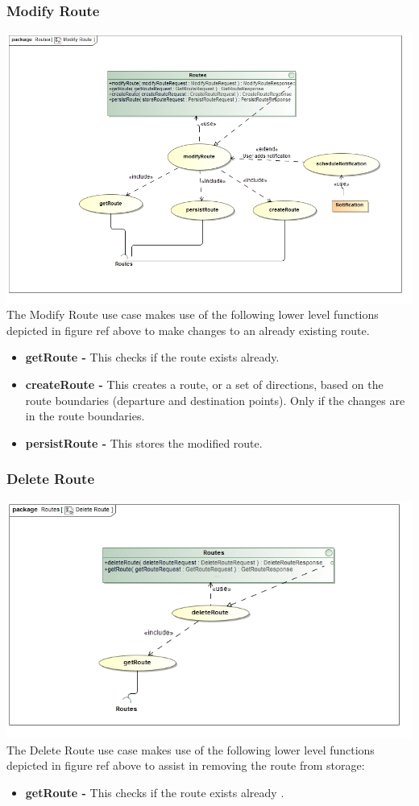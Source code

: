 \documentclass[a4paper,12pt]{article}
\begin{document}
\subsubsection{Modify Route} 
\includegraphics[width=\textwidth]{images/Modify_Route.jpg}
The Modify Route use case makes use of the following lower level functions depicted in {figure ref} above to make changes to an already existing route.
\begin{itemize}
\item \textbf{getRoute -} This checks if the route exists already.
\item \textbf{createRoute -} This creates a route, or a set of directions, based on the route boundaries (departure and destination points). Only if the changes are in the route boundaries.
\item \textbf{persistRoute -} This stores the modified route.
\end{itemize}

\subsubsection{Delete Route}
\includegraphics[width=\textwidth]{images/Delete_Route.jpg}
The Delete Route use case makes use of the following lower level functions depicted in {figure ref} above to assist in removing the route from storage:
\begin{itemize}
\item \textbf{getRoute -} This checks if the route exists already .
\end{itemize}
\end{document}
